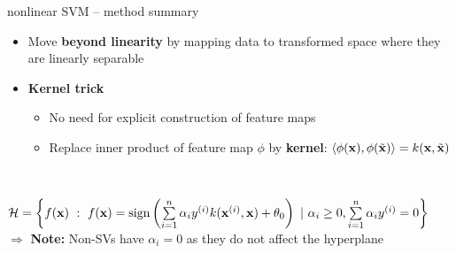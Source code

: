 \begin{frame}{nonlinear SVM -- method summary}

\footnotesize

   

\medskip

\begin{itemize}
  \item Move \textbf{beyond linearity} by mapping data to 
  transformed space where they are linearly separable
  \item \textbf{Kernel trick} %
  \begin{itemize}
    \item No need for explicit construction of feature maps
    \item Replace inner product of feature map $\phi$ by \textbf{kernel}: $\left\langle \phi(\mathbf{x}), \phi(\tilde {\mathbf{x}}) \right\rangle = k(\mathbf{x}, \tilde {\mathbf{x}})$
  \end{itemize}
\end{itemize}


\medskip


 ~~

$\mathcal{H}  = \left \{f(\mathbf{x}) ~:~ f(\mathbf{x}) = \operatorname{sign} \left( \sum\limits_{i=1}^n \alpha_i y^{(i)} k(\mathbf{x}^{(i)}, \mathbf{x}) + \theta_0 \right) ~|~ \alpha_i \geq 0,  \sum\limits_{i=1}^n \alpha_i y^{(i)} = 0 \right \}$\\
$\Rightarrow$ \textbf{Note:} Non-SVs have $\alpha_i = 0$ as they do not affect the hyperplane


\end{frame}
